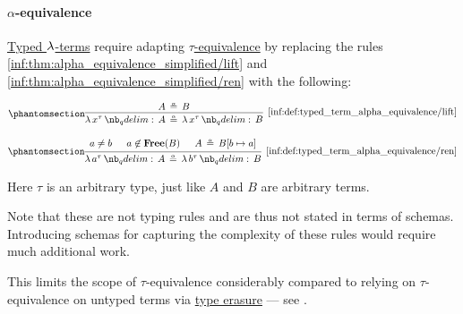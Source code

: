 \paragraph{\( \alpha \)-equivalence}

\begin{definition}\label{def:typed_term_alpha_equivalence}
  \hyperref[def:typed_lambda_term]{Typed \( \mathrm{\lambda} \)-terms} require adapting \hyperref[def:lambda_term_alpha_equivalence]{\( \tau \)-equivalence} by replacing the rules \ref{inf:thm:alpha_equivalence_simplified/lift} and \ref{inf:thm:alpha_equivalence_simplified/ren} with the following:
  \begin{paracol}{2}
    \begin{leftcolumn}
      \begin{equation*}\taglabel[\ensuremath{ \logic{Lift}_\tau^{\T{tt}} }]{inf:def:typed_term_alpha_equivalence/lift}
        \begin{prooftree}
          \hypo{ A \aequiv B }
          \infer1[\ref{inf:def:typed_term_alpha_equivalence/lift}]{ \qabs {x^\tau} A \aequiv \qabs {x^\tau} B }
        \end{prooftree}
      \end{equation*}
    \end{leftcolumn}

    \begin{rightcolumn}
      \begin{equation*}\taglabel[\ensuremath{ \logic{Ren}_\tau^{\T{tt}} }]{inf:def:typed_term_alpha_equivalence/ren}
        \begin{prooftree}
          \hypo{ a \neq b }
          \hypo{ a \not\in \op*{Free}(B) }
          \hypo{ A \aequiv B[b \mapsto a] }
          \infer3[\ref{inf:def:typed_term_alpha_equivalence/ren}]{ \qabs {a^\tau} A \aequiv \qabs {b^\tau} B }
        \end{prooftree}
      \end{equation*}
    \end{rightcolumn}
  \end{paracol}
\end{definition}
\begin{comments}
  \item Here \( \tau \) is an arbitrary type, just like \( A \) and \( B \) are arbitrary terms.

  \item Note that these are not typing rules and are thus not stated in terms of schemas. Introducing schemas for capturing the complexity of these rules would require much additional work.

  \item This limits the scope of \( \tau \)-equivalence considerably compared to relying on \( \tau \)-equivalence on untyped terms via \hyperref[alg:type_erasure]{type erasure} --- see .
\end{comments}


